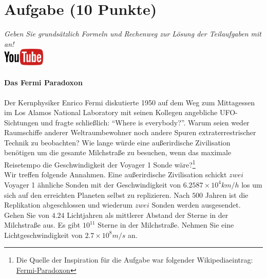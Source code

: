 \documentclass[a4paper, 9pt]{scrartcl}\usepackage[]{graphicx}\usepackage[]{xcolor}
\begin{document}
 
\clearpage

\section{Aufgabe \hfill (10 Punkte)}

\textit{Geben Sie grunds{\"a}tzlich Formeln und Rechenweg zur L{\"o}sung der
  Teilaufgaben mit an!} \\[1Ex]

\hfill\href{https://youtu.be/iCQogS6KhPM}{\includegraphics[width =
  2cm]{img/youtube}} %
\hspace{2Ex}

\paragraph{Das Fermi Paradoxon}



Der Kernphysiker Enrico Fermi diskutierte 1950 auf dem Weg zum Mittagessen
im Los Alamos National Laboratory mit seinen Kollegen angebliche
UFO-Sichtungen und fragte schlie{\ss}lich: "`Where is everybody?"'. Warum seien
weder Raumschiffe anderer Weltraumbewohner noch andere Spuren
extraterrestrischer Technik zu beobachten? Wie lange w{\"u}rde eine au{\ss}erirdische
Zivilisation ben{\"o}tigen um die gesamte Milchstra{\ss}e zu
besuchen, wenn das maximale Reisetempo die Geschwindigkeit der Voyager 1 Sonde w{\"a}re?\footnote{Die Quelle der Inspiration
  für die Aufgabe war folgender Wikipediaeintrag:
  \href{https://de.wikipedia.org/wiki/Fermi-Paradoxon}{Fermi-Paradoxon}}\\[-1ex]

Wir treffen folgende Annahmen. Eine au{\ss}erirdische Zivilisation schickt $zwei$
Voyager 1 {\"a}hnliche Sonden mit der Geschwindigkeit von $\ensuremath{6.2587\times 10^{4}}km/h$
los um sich auf den erreichten Planeten selbst zu replizieren. Nach
$500$ Jahren ist die Replikation abgeschlossen und wiederum
$zwei$ Sonden werden ausgesendet. Gehen Sie von
$4.24$ Lichtjahren als mittlerer Abstand der Sterne in der
Milchstra{\ss}e aus. Es gibt $\ensuremath{10^{11}}$ Sterne in der Milchstra{\ss}e. Nehmen
Sie eine Lichtgeschwindigkeit von $\ensuremath{2.7\times 10^{8}}m/s$ an.
\end{document}
